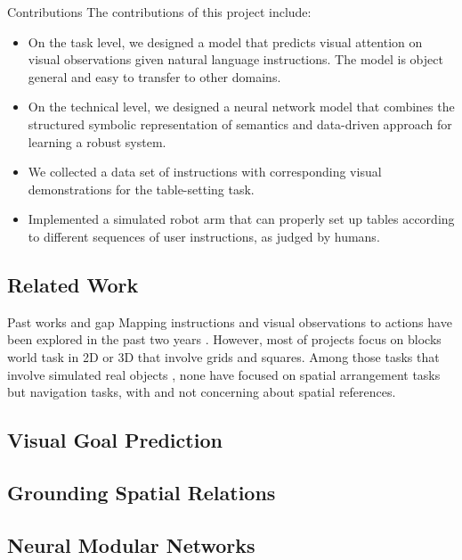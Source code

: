 \documentclass[conference]{IEEEtran}
\newenvironment{towrite}%
  {\begin{mdframed}[backgroundcolor=lightgray,
  					topline=false,
  					rightline=false,
  					leftline=false,
  					bottomline=false
  					]\smallskip}%
  {\smallskip\end{mdframed}}
\begin{document}
\color{red} Contributions \color{black} The contributions of this project include:
\begin{itemize}
	\item On the task level, we designed a model that predicts visual attention on visual observations given natural language instructions. The model is object general and easy to transfer to other domains.
	\item On the technical level, we designed a neural network model that combines the structured symbolic representation of semantics and data-driven approach for learning a robust system.
	\item We collected a data set of instructions with corresponding visual demonstrations for the table-setting task. 
	\item Implemented a simulated robot arm that can properly set up tables according to different sequences of user instructions, as judged by humans. 
	\end{itemize}






\begin{towrite}
\section{Related Work}

\color{red} Past works and gap \color{black} Mapping instructions and visual observations to actions have been explored in the past two years \cite{misra2018mapping, blukis2018following, kitaev2017misty, misra2017mapping, bisk2018learning, chaplot2018gated, janner2018representation, xiong2018scheduled, sinha2018attention}. However, most of projects focus on blocks world task in 2D \cite{misra2017mapping, janner2018representation, xiong2018scheduled, sinha2018attention} or 3D \cite{kitaev2017misty, bisk2018learning} that involve grids and squares. Among those tasks that involve simulated real objects \cite{misra2018mapping, chaplot2018gated, blukis2018following}, none have focused on spatial arrangement tasks but navigation tasks, with \cite{misra2018mapping} and \cite{chaplot2018gated} not concerning about spatial references.

\subsection{Visual Goal Prediction}

\subsection{Grounding Spatial Relations}


\subsection{Neural Modular Networks}

\end{towrite}
\end{document}
